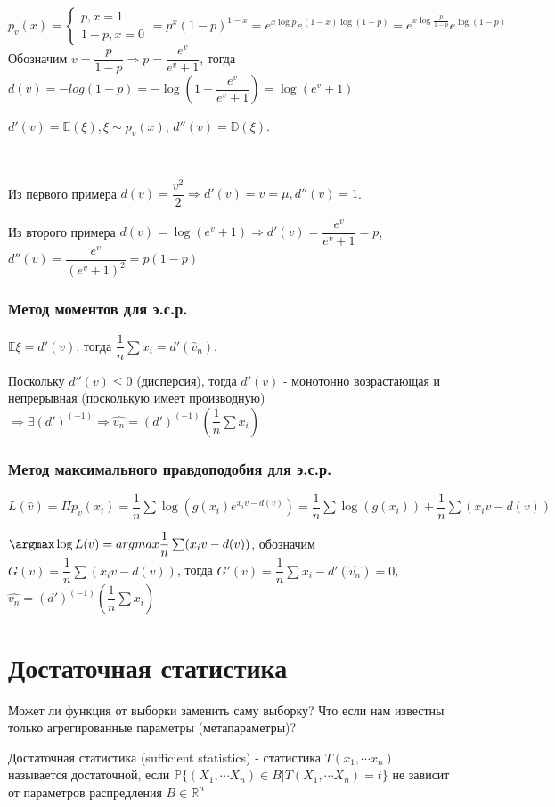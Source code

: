 \documentclass[a4 paper]{article}
\begin{document}
\begin{equation*}
p_v(x) = 
    \begin{cases}
        p,x = 1 \\
        1-p, x = 0
    \end{cases}
= p^x (1 - p)^{1 - x} = e^{x\log p} e^{(1-x) \log (1-p)} = e^{x \log \frac{p}{1-p}} e^{\log (1-p)}
\end{equation*}
Обозначим $v = \dfrac{p}{1 - p} \Rightarrow p = \dfrac{e^v}{e^v + 1}$, тогда $d(v) = -log(1-p) = - \log \left(1 - \dfrac{e^v}{e^v + 1} \right) = \log(e^v + 1)$
\begin{prop}
$d'(v) = \mathbb{E}(\xi), \xi \sim p_v(x)$, $d''(v) = \mathbb{D}(\xi)$.
\end{prop}
\begin{prf}
----
\end{prf}

Из первого примера $d(v) = \dfrac{v^2}{2} \Rightarrow d'(v) = v = \mu, d''(v) = 1$.

Из второго примера $d(v) = \log(e^v + 1) \Rightarrow d'(v) = \dfrac{e^v}{e^v + 1} = p$, $d''(v) = \dfrac{e^v}{(e^v + 1)^2} = p(1-p)$


\subsubsection{Метод моментов для э.с.р.}

$\mathbb{E}\xi = d'(v)$, тогда $\dfrac1n \sum x_i = d'(\hat{v}_n)$. 

Поскольку $d''(v) \leq 0$ (дисперсия), тогда $d'(v)$ - монотонно возрастающая и непрерывная (посколькую имеет производную) $\Rightarrow \exists (d')^(-1) \Rightarrow \hat{v_n} = (d')^{(-1)} \left(\dfrac1n \sum x_i \right)$

\subsubsection{Метод максимального правдоподобия для э.с.р.}

$L(\hat{v}) = \Pi p_{v}(x_i) = \dfrac1n \sum \log (g(x_i) e^{x_iv - d(v)}) = \dfrac1n \sum \log (g(x_i)) + \dfrac1n \sum (x_iv - d(v))$

$\argmax \log L(v) = argmax \dfrac1n \sum (x_iv - d(v))$, обозначим $G(v) = \dfrac1n \sum (x_iv - d(v))$, тогда $G'(v) = \dfrac1n\sum x_i - d'(\hat{v_n}) = 0$, $\hat{v_n} = (d')^{(-1)}\left(\dfrac1n \sum x_i \right)$

\section{Достаточная статистика}
Может ли функция от выборки заменить саму выборку? Что если нам известны только агрегированные параметры (метапараметры)?
\begin{defin}
Достаточная статистика (sufficient statistics) - статистика $T(x_1, \cdots x_n)$ называется достаточной, если $\mathbb{P}\{(X_1, \cdots X_n) \in B | T(X_1, \cdots X_n) = t\}$ не зависит от параметров распредления $ B\in \mathbb{R}^n$
\end{defin}
\end{document}
